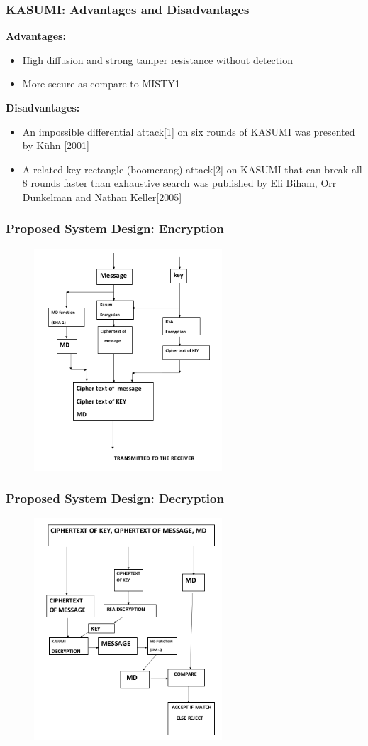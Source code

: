 \documentclass{beamer}
\begin{document}
\begin{frame}[t]
	\frametitle{KASUMI: Advantages and Disadvantages}
	\textbf{Advantages: }
	\begin{itemize}
		\item High diffusion and strong tamper resistance without detection
		\item More secure as compare to MISTY1
	\end{itemize}
\textbf{Disadvantages: }
\begin{itemize}
	\item An impossible differential attack[1] on six rounds of KASUMI was presented by Kühn [2001]
	\item A related-key rectangle (boomerang) attack[2] on KASUMI that can break all 8 rounds faster than exhaustive search was published by Eli Biham, Orr Dunkelman and Nathan Keller[2005]
\end{itemize}
\end{frame}

\begin{frame}
	\frametitle{Proposed System Design: Encryption}
	\begin{figure}[h]
		\includegraphics[width=7cm]{en}
	\end{figure}
\end{frame}
	
\begin{frame}
	\frametitle{Proposed System Design: Decryption}
	\begin{figure}[h]
		\includegraphics[width=7cm]{de}
	\end{figure}
	
\end{frame}
\end{document}
